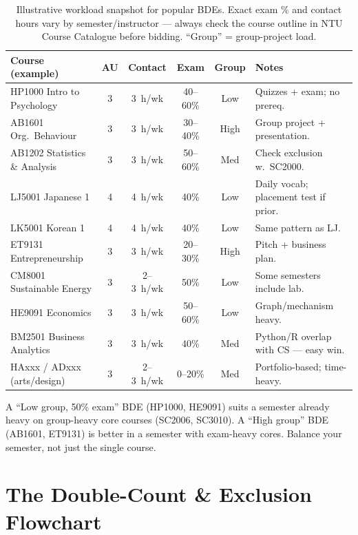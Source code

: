 \begin{table}[h]
\centering
\small
\renewcommand{\arraystretch}{1.22}
\begin{tabular}{@{}p{3.6cm}ccccp{3.1cm}@{}}
\toprule
Course (example) & AU & Contact & Exam & Group & Notes \\
\midrule
HP1000 Intro to Psychology & 3 & 3~h/wk & 40--60\% & Low & Quizzes + exam; no prereq. \\
AB1601 Org.\ Behaviour & 3 & 3~h/wk & 30--40\% & High & Group project + presentation. \\
AB1202 Statistics \& Analysis & 3 & 3~h/wk & 50--60\% & Med & Check exclusion w.\ SC2000. \\
LJ5001 Japanese 1 & 4 & 4~h/wk & 40\% & Low & Daily vocab; placement test if prior. \\
LK5001 Korean 1 & 4 & 4~h/wk & 40\% & Low & Same pattern as LJ. \\
ET9131 Entrepreneurship & 3 & 3~h/wk & 20--30\% & High & Pitch + business plan. \\
CM8001 Sustainable Energy & 3 & 2--3~h/wk & 50\% & Low & Some semesters include lab. \\
HE9091 Economics & 3 & 3~h/wk & 50--60\% & Low & Graph/mechanism heavy. \\
BM2501 Business Analytics & 3 & 3~h/wk & 40\% & Med & Python/R overlap with CS --- easy win. \\
HAxxx / ADxxx (arts/design) & 3 & 2--3~h/wk & 0--20\% & Med & Portfolio-based; time-heavy. \\
\bottomrule
\end{tabular}
\caption{Illustrative workload snapshot for popular BDEs. Exact exam \% and contact hours vary by semester/instructor --- always check the course outline in NTU Course Catalogue before bidding. ``Group'' = group-project load.}
\label{tab:bde-workload}
\end{table}

\begin{remark}
A ``Low group, 50\% exam'' BDE (HP1000, HE9091) suits a semester already heavy on group-heavy core courses (SC2006, SC3010). A ``High group'' BDE (AB1601, ET9131) is better in a semester with exam-heavy cores. Balance your semester, not just the single course.
\end{remark}

\section{The Double-Count \& Exclusion Flowchart}
\label{sec:double-count-flow}

